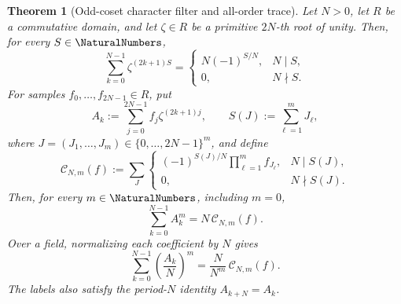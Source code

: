\documentclass[11pt,oneside]{article}
\newtheorem{theorem}{Theorem}[section]
\theoremstyle{definition}
\theoremstyle{remark}
\begin{document}
\begin{theorem}[Odd-coset character filter and all-order trace]
\label{thm:odd-coset-dft-trace}
Let $N>0$, let $R$ be a commutative domain, and let
$\zeta\in R$ be a primitive $2N$-th root of unity.  Then, for every
$S\in\NaturalNumbers$,
\begin{equation}
 \sum_{k=0}^{N-1}\zeta^{(2k+1)S}
 =\begin{cases}
   N(-1)^{S/N},&N\mid S,\\
   0,&N\nmid S.
  \end{cases}                                               \label{eq:odd-coset-root-filter}
\end{equation}
For samples $f_0,\ldots,f_{2N-1}\in R$, put
\begin{equation}
 A_k:=\sum_{j=0}^{2N-1}f_j\zeta^{(2k+1)j},
 \qquad S(J):=\sum_{\ell=1}^{m}J_\ell,                    \label{eq:odd-dft-definition}
\end{equation}
where $J=(J_1,\ldots,J_m)\in\{0,\ldots,2N-1\}^m$, and define
\begin{equation}
 \mathcal C_{N,m}(f):=
 \sum_J
  \begin{cases}
   (-1)^{S(J)/N}\prod_{\ell=1}^{m}f_{J_\ell},&N\mid S(J),\\
   0,&N\nmid S(J).
  \end{cases}                                               \label{eq:odd-dft-convolution}
\end{equation}
Then, for every $m\in\NaturalNumbers$, including $m=0$,
\begin{equation}
 \sum_{k=0}^{N-1}A_k^m=N\,\mathcal C_{N,m}(f).             \label{eq:odd-dft-power-trace}
\end{equation}
Over a field, normalizing each coefficient by $N$ gives
\begin{equation}
 \sum_{k=0}^{N-1}\left(\frac{A_k}{N}\right)^m
 =\frac{N}{N^m}\,\mathcal C_{N,m}(f).                     \label{eq:normalized-odd-dft-power-trace}
\end{equation}
The labels also satisfy the period-$N$ identity $A_{k+N}=A_k$.
\end{theorem}
\end{document}
